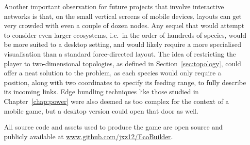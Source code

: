Another important observation for future projects that involve interactive networks is that, on the small vertical screens of mobile devices, layouts can get very crowded with even a couple of dozen nodes.
Any sequel that would attempt to consider even larger ecosystems, i.e.\ in the order of hundreds of species, would be more suited to a desktop setting, and would likely require a more specialised visualisation than a standard force-directed layout.
The idea of restricting the player to two-dimensional topologies, as defined in Section~\ref{sec:topology}, could offer a neat solution to the problem, as each species would only require a position, along with two coordinates to specify its feeding range, to fully describe its incoming links.
Edge bundling techniques like those studied in Chapter~\ref{chap:power} were also deemed as too complex for the context of a mobile game, but a desktop version could open that door as well.

All source code and assets used to produce the game are open source and publicly available at \url{www.github.com/jxz12/EcoBuilder}.